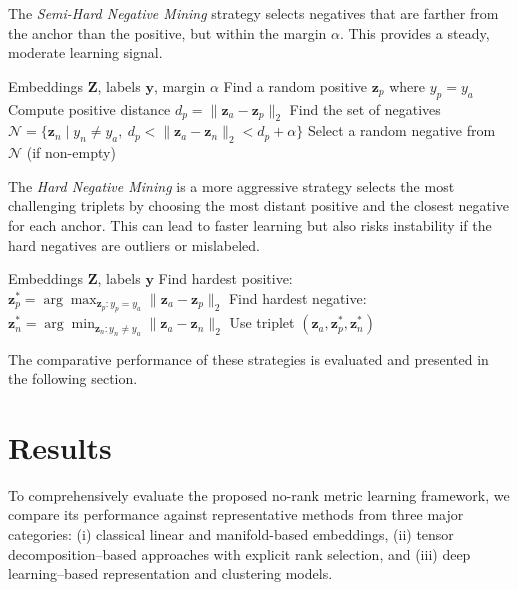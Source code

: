 \documentclass[a4paper,12pt,reqno]{amsart}
\theoremstyle{definition}
\theoremstyle{remark}
\begin{document}
The \textit{Semi-Hard Negative Mining} strategy selects negatives that are farther from the anchor than the positive, but within the margin $\alpha$. This provides a steady, moderate learning signal.
\begin{algorithm}[H]
\caption{Semi-Hard Negative Mining}
\begin{algorithmic}[1]
\REQUIRE Embeddings $\mathbf{Z}$, labels $\mathbf{y}$, margin $\alpha$
    \STATE Find a random positive $\mathbf{z}_p$ where $y_p = y_a$
    \STATE Compute positive distance $d_p = \|\mathbf{z}_a - \mathbf{z}_p\|_2$
    \STATE Find the set of negatives $\mathcal{N} = \{\mathbf{z}_n \mid y_n \neq y_a, \ d_p < \|\mathbf{z}_a - \mathbf{z}_n\|_2 < d_p + \alpha \}$
    \STATE Select a random negative from $\mathcal{N}$ (if non-empty)
\ENDFOR
\end{algorithmic}
\end{algorithm}
The \textit{Hard Negative Mining} is a more aggressive strategy selects the most challenging triplets by choosing the most distant positive and the closest negative for each anchor. This can lead to faster learning but also risks instability if the hard negatives are outliers or mislabeled.
\begin{algorithm}[H]
\caption{Hard Negative Mining}
\begin{algorithmic}[1]
\REQUIRE Embeddings $\mathbf{Z}$, labels $\mathbf{y}$
    \STATE Find hardest positive: $\mathbf{z}_p^* = \arg\max_{\mathbf{z}_p: y_p = y_a} \|\mathbf{z}_a - \mathbf{z}_p\|_2$
    \STATE Find hardest negative: $\mathbf{z}_n^* = \arg\min_{\mathbf{z}_n: y_n \neq y_a} \|\mathbf{z}_a - \mathbf{z}_n\|_2$
    \STATE Use triplet $(\mathbf{z}_a, \mathbf{z}_p^*, \mathbf{z}_n^*)$
\ENDFOR
\end{algorithmic}
\end{algorithm}
The comparative performance of these strategies is evaluated and presented in the following section.


\section{Results}\label{sec:res}
	To comprehensively evaluate the proposed no-rank metric learning framework, we compare its performance against representative methods from three major categories: (i) classical linear and manifold-based embeddings, (ii) tensor decomposition–based approaches with explicit rank selection, and (iii) deep learning–based representation and clustering models.\\
\end{document}
